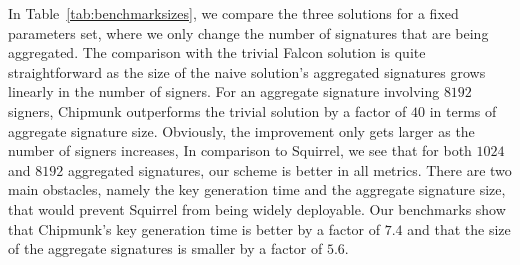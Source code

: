 In Table~\ref{tab:benchmarksizes}, we compare the three solutions for a fixed parameters set, where we only change the number of signatures that are being aggregated.
The comparison with the trivial Falcon solution is quite straightforward as the size of the naive solution's aggregated signatures grows linearly in the number of signers.
For an aggregate signature involving $8192$ signers, Chipmunk outperforms the trivial solution by a factor of $40$ in terms of aggregate signature size.
Obviously, the improvement only gets larger as the number of signers increases,
In comparison to Squirrel, we see that for both $1024$ and $8192$ aggregated signatures, our scheme is better in all metrics.
There are two main obstacles, namely the key generation time and the aggregate signature size, that would prevent Squirrel from being widely deployable.
Our benchmarks show that Chipmunk's key generation time is better by a factor of $7.4$ and that the size of the aggregate signatures is smaller by a factor of $5.6$.%
\bgroup
\setlength{\tabcolsep}{0.5em}
\renewcommand{\arraystretch}{1.1}
